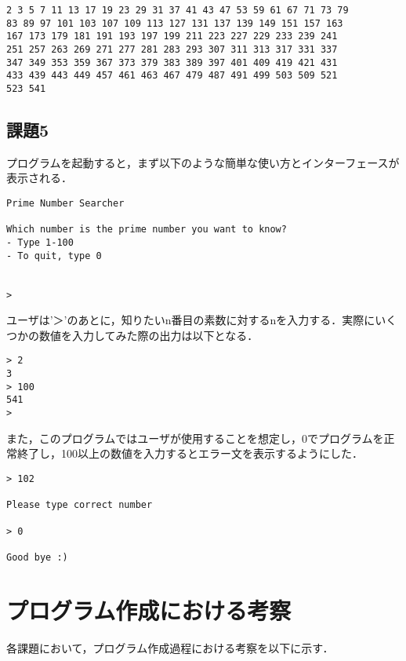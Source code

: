 \documentclass[a4j]{jarticle}
\begin{document}
{\baselineskip 3mm
\begin{verbatim}
2 3 5 7 11 13 17 19 23 29 31 37 41 43 47 53 59 61 67 71 73 79 
83 89 97 101 103 107 109 113 127 131 137 139 149 151 157 163 
167 173 179 181 191 193 197 199 211 223 227 229 233 239 241 
251 257 263 269 271 277 281 283 293 307 311 313 317 331 337 
347 349 353 359 367 373 379 383 389 397 401 409 419 421 431 
433 439 443 449 457 461 463 467 479 487 491 499 503 509 521 
523 541 
\end{verbatim}
}


\subsection{課題5}

プログラムを起動すると，まず以下のような簡単な使い方とインターフェースが表示される．

{\baselineskip 3mm
\begin{verbatim}
Prime Number Searcher

Which number is the prime number you want to know?
- Type 1-100
- To quit, type 0


> 
\end{verbatim}
}

ユーザは'＞'のあとに，知りたいn番目の素数に対するnを入力する．実際にいくつかの数値を入力してみた際の出力は以下となる．

{\baselineskip 3mm
\begin{verbatim}
> 2
3
> 100
541
> 
\end{verbatim}
}

また，このプログラムではユーザが使用することを想定し，0でプログラムを正常終了し，100以上の数値を入力するとエラー文を表示するようにした．

{\baselineskip 3mm
\begin{verbatim}
> 102

Please type correct number

> 0

Good bye :)
\end{verbatim}
}





%
%

\section{プログラム作成における考察}

各課題において，プログラム作成過程における考察を以下に示す．
\end{document}
